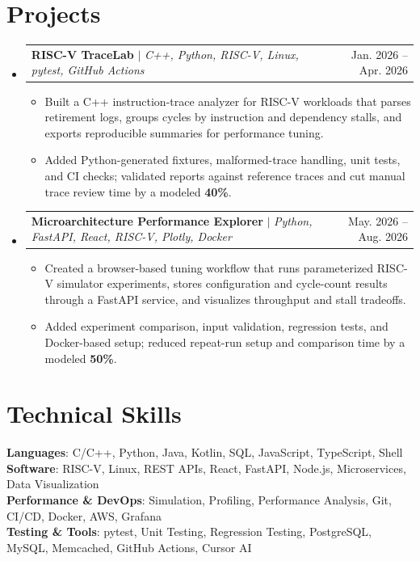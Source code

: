 \documentclass[letterpaper,11pt]{article}
\makeatletter
\newcommand{\resumeItem}[1]{
  \item\small{
    {#1 \vspace{-2pt}}
  }
}
\newcommand{\resumeProjectHeading}[2]{
    \item
    \begin{tabular*}{0.97\textwidth}{l@{\extracolsep{\fill}}r}
      \small#1 & #2 \\
    \end{tabular*}\vspace{-7pt}
}
\newcommand{\resumeSubHeadingListStart}{\begin{itemize}[leftmargin=0.15in, label={}]}
\newcommand{\resumeSubHeadingListEnd}{\end{itemize}}
\newcommand{\resumeItemListStart}{\begin{itemize}}
\newcommand{\resumeItemListEnd}{\end{itemize}\vspace{-5pt}}
\makeatother
\begin{document}
\section{Projects}
\resumeSubHeadingListStart
\resumeProjectHeading
{\textbf{RISC-V TraceLab} $|$ \emph{C++, Python, RISC-V, Linux, pytest, GitHub Actions}}{Jan. 2026 -- Apr. 2026}
\resumeItemListStart
\resumeItem{Built a C++ instruction-trace analyzer for RISC-V workloads that parses retirement logs, groups cycles by instruction and dependency stalls, and exports reproducible summaries for performance tuning.}
\resumeItem{Added Python-generated fixtures, malformed-trace handling, unit tests, and CI checks; validated reports against reference traces and cut manual trace review time by a modeled \textbf{40\%}.}
\resumeItemListEnd
\resumeProjectHeading
{\textbf{Microarchitecture Performance Explorer} $|$ \emph{Python, FastAPI, React, RISC-V, Plotly, Docker}}{May. 2026 -- Aug. 2026}
\resumeItemListStart
\resumeItem{Created a browser-based tuning workflow that runs parameterized RISC-V simulator experiments, stores configuration and cycle-count results through a FastAPI service, and visualizes throughput and stall tradeoffs.}
\resumeItem{Added experiment comparison, input validation, regression tests, and Docker-based setup; reduced repeat-run setup and comparison time by a modeled \textbf{50\%}.}
\resumeItemListEnd
\resumeSubHeadingListEnd



%
\section{Technical Skills}
\begin{itemize}[leftmargin=0.15in, label={}]
  \small{\item{
        \textbf{Languages}{: C/C++, Python, Java, Kotlin, SQL, JavaScript, TypeScript, Shell} \\
        \textbf{Software}{: RISC-V, Linux, REST APIs, React, FastAPI, Node.js, Microservices, Data Visualization} \\
        \textbf{Performance \& DevOps}{: Simulation, Profiling, Performance Analysis, Git, CI/CD, Docker, AWS, Grafana} \\
        \textbf{Testing \& Tools}{: pytest, Unit Testing, Regression Testing, PostgreSQL, MySQL, Memcached, GitHub Actions, Cursor AI}
        }}
\end{itemize}


\end{document}
